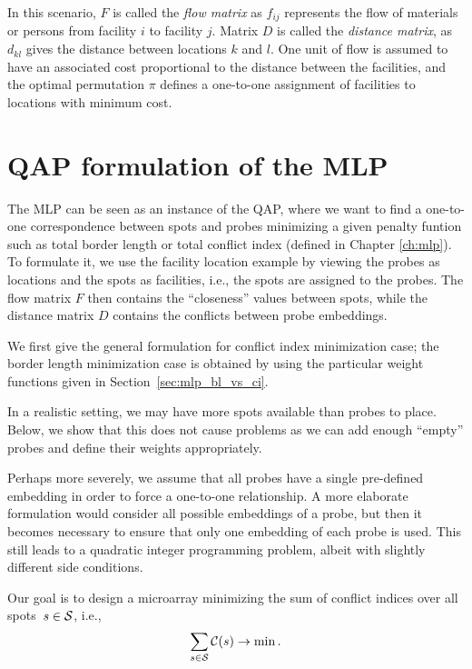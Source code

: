In this scenario, $F$ is called the \emph{flow matrix} as $f_{ij}$ represents
the flow of materials or persons from facility $i$ to facility $j$. Matrix $D$
is called the \emph{distance matrix}, as $d_{kl}$ gives the distance between
locations $k$ and $l$. One unit of flow is assumed to have an associated cost
proportional to the distance between the facilities, and the optimal permutation
$\pi$ defines a one-to-one assignment of facilities to locations with minimum
cost.

\section{QAP formulation of the MLP}
\label{sec:qap_mlp}

The MLP can be seen as an instance of the QAP, where we want to find a
one-to-one correspondence between spots and probes minimizing a given penalty
funtion such as total border length or total conflict index (defined in Chapter
\ref{ch:mlp}). To formulate it, we use the facility location example by viewing
the probes as locations and the spots as facilities, i.e., the spots are
assigned to the probes. The flow matrix $F$ then contains the ``closeness''
values between spots, while the distance matrix $D$ contains the conflicts
between probe embeddings.

We first give the general formulation for conflict index minimization case; the
border length minimization case is obtained by using the particular weight
functions given in Section~\ref{sec:mlp_bl_vs_ci}.

In a realistic setting, we may have more spots available than probes to place.
Below, we show that this does not cause problems as we can add enough ``empty''
probes and define their weights appropriately.

Perhaps more severely, we assume that all probes have a single pre-defined
embedding in order to force a one-to-one relationship.  A more elaborate
formulation would consider all possible embeddings of a probe, but then it
becomes necessary to ensure that only one embedding of each probe is used. This
still leads to a quadratic integer programming problem, albeit with slightly
different side conditions.

Our goal is to design a microarray minimizing the sum of conflict indices over
all spots~$s \in {\mathcal{S}}$, i.e.,
\[
\sum_{s \in {\mathcal{S}}} \mathcal{C}(s) \to \min.
\]

